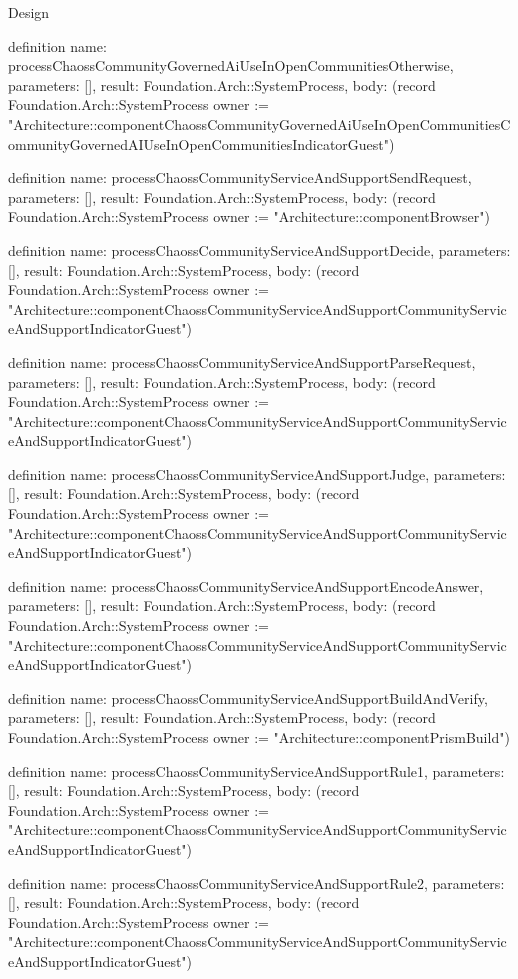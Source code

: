 \begin{lexlean}{Design}
\begin{semanticmodule}
definition{
  name: processChaossCommunityGovernedAiUseInOpenCommunitiesOtherwise,
  parameters: [],
  result: Foundation.Arch::SystemProcess,
  body: (record Foundation.Arch::SystemProcess {owner := "Architecture::componentChaossCommunityGovernedAiUseInOpenCommunitiesCommunityGovernedAIUseInOpenCommunitiesIndicatorGuest"})
}

definition{
  name: processChaossCommunityServiceAndSupportSendRequest,
  parameters: [],
  result: Foundation.Arch::SystemProcess,
  body: (record Foundation.Arch::SystemProcess {owner := "Architecture::componentBrowser"})
}

definition{
  name: processChaossCommunityServiceAndSupportDecide,
  parameters: [],
  result: Foundation.Arch::SystemProcess,
  body: (record Foundation.Arch::SystemProcess {owner := "Architecture::componentChaossCommunityServiceAndSupportCommunityServiceAndSupportIndicatorGuest"})
}

definition{
  name: processChaossCommunityServiceAndSupportParseRequest,
  parameters: [],
  result: Foundation.Arch::SystemProcess,
  body: (record Foundation.Arch::SystemProcess {owner := "Architecture::componentChaossCommunityServiceAndSupportCommunityServiceAndSupportIndicatorGuest"})
}

definition{
  name: processChaossCommunityServiceAndSupportJudge,
  parameters: [],
  result: Foundation.Arch::SystemProcess,
  body: (record Foundation.Arch::SystemProcess {owner := "Architecture::componentChaossCommunityServiceAndSupportCommunityServiceAndSupportIndicatorGuest"})
}

definition{
  name: processChaossCommunityServiceAndSupportEncodeAnswer,
  parameters: [],
  result: Foundation.Arch::SystemProcess,
  body: (record Foundation.Arch::SystemProcess {owner := "Architecture::componentChaossCommunityServiceAndSupportCommunityServiceAndSupportIndicatorGuest"})
}

definition{
  name: processChaossCommunityServiceAndSupportBuildAndVerify,
  parameters: [],
  result: Foundation.Arch::SystemProcess,
  body: (record Foundation.Arch::SystemProcess {owner := "Architecture::componentPrismBuild"})
}

definition{
  name: processChaossCommunityServiceAndSupportRule1,
  parameters: [],
  result: Foundation.Arch::SystemProcess,
  body: (record Foundation.Arch::SystemProcess {owner := "Architecture::componentChaossCommunityServiceAndSupportCommunityServiceAndSupportIndicatorGuest"})
}

definition{
  name: processChaossCommunityServiceAndSupportRule2,
  parameters: [],
  result: Foundation.Arch::SystemProcess,
  body: (record Foundation.Arch::SystemProcess {owner := "Architecture::componentChaossCommunityServiceAndSupportCommunityServiceAndSupportIndicatorGuest"})
}


\end{semanticmodule}
\end{lexlean}
